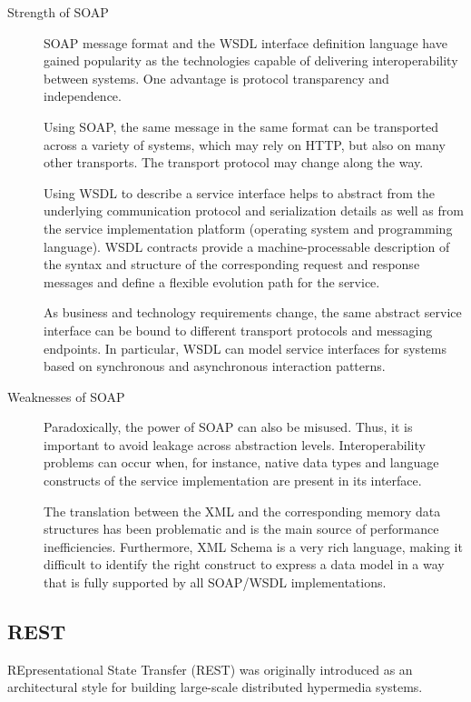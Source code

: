 \documentclass[thesis=B,english]{FITthesis}[2012/10/20]
\begin{document}
	\begin{description}
		\item[Strength of SOAP] 
SOAP message format and the WSDL interface definition language have gained popularity as the technologies capable of delivering interoperability between systems. One advantage is protocol transparency and independence.

Using SOAP, the same message in the same format can be transported across a variety of  systems, which may rely on HTTP, but also on many other transports. The transport protocol may change along the way.

Using WSDL to describe a service interface helps to abstract from the underlying communication protocol and serialization details as well as from the service implementation platform (operating system and programming language). WSDL contracts provide a machine-processable description of the syntax and structure of the corresponding request and response messages and define a flexible evolution path for the service. 

As business and technology requirements change, the same abstract service interface can be bound to different transport protocols and messaging endpoints. In particular, WSDL can model service interfaces for systems based on synchronous and asynchronous interaction patterns.\cite{soaprest}
		\item[Weaknesses of SOAP] 
Paradoxically, the power of SOAP can also be misused. Thus, it is important to avoid leakage across abstraction levels. Interoperability problems can occur when, for instance, native data types and language constructs of the service implementation are present in its interface.\cite{soaprest}

The translation between the XML and the corresponding memory data structures has been problematic and is the main source of performance inefficiencies. Furthermore, XML Schema is a very rich language, making it difficult to identify the right construct to express a data model in a way that is fully supported by all SOAP/WSDL implementations.\cite{soaprest}
	\end{description}
\subsection{REST}
REpresentational State Transfer (REST) was originally introduced as an architectural style for building large-scale distributed hypermedia systems.
\end{document}
